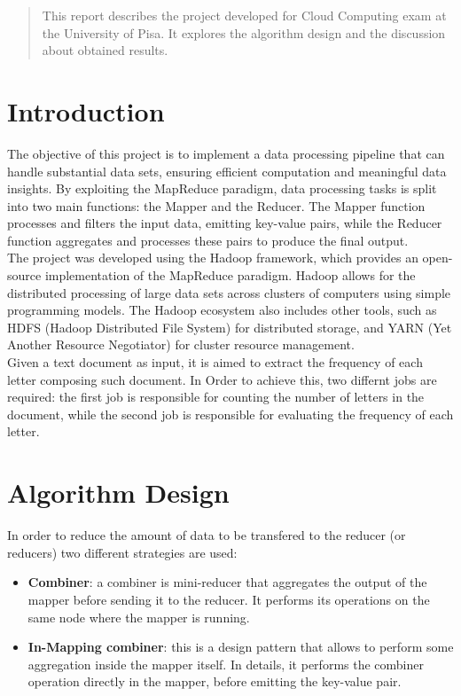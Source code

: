 \documentclass[a4paper, 12pt]{article}
\begin{document}


\tableofcontents
\newpage
\begin{abstract}

  \noindent This report describes the project developed for Cloud Computing exam at the University of Pisa. It explores the algorithm design and the discussion about obtained results.

\end{abstract}


\section{Introduction}

The objective of this project is to implement a data processing pipeline that can handle substantial data sets, ensuring efficient computation and meaningful data insights. By exploiting the MapReduce paradigm, data processing tasks is split into two main functions: the Mapper and the Reducer. The Mapper function processes and filters the input data, emitting key-value pairs, while the Reducer function aggregates and processes these pairs to produce the final output.\\
The project was developed using the Hadoop framework, which provides an open-source implementation of the MapReduce paradigm. Hadoop allows for the distributed processing of large data sets across clusters of computers using simple programming models. The Hadoop ecosystem also includes other tools, such as HDFS (Hadoop Distributed File System) for distributed storage, and YARN (Yet Another Resource Negotiator) for cluster resource management.\\

\noindent Given a text document as input, it is aimed to extract the frequency of each letter composing such document. In Order to achieve this, two differnt jobs are required: the first job is responsible for counting the number of letters in the document, while the second job is responsible for evaluating the frequency of each letter.\\





\section{Algorithm Design}
In order to reduce the amount of data to be transfered to the reducer (or reducers) two different strategies are used:
\begin{itemize}
  \item \textbf{Combiner}: a combiner is mini-reducer that aggregates the output of the mapper before sending it to the reducer. It performs its operations on the same node where the mapper is running.
  \item \textbf{In-Mapping combiner}: this is a design pattern that allows to perform some aggregation inside the mapper itself. In details, it performs the combiner operation directly in the mapper, before emitting the key-value pair.
\end{itemize}
\end{document}
